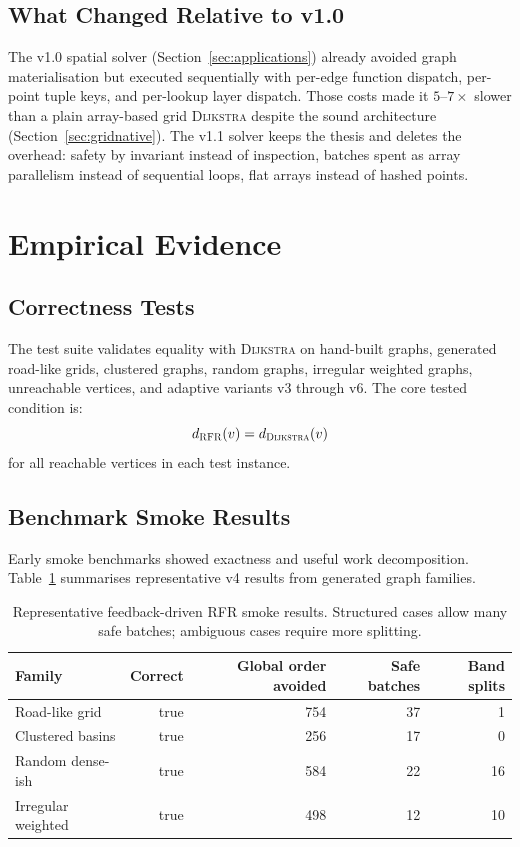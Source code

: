 \documentclass[11pt]{article}
\newcommand{\RFR}{\textsc{RFR}}
\newcommand{\Dijkstra}{\textsc{Dijkstra}}
\begin{document}
\subsection{What Changed Relative to v1.0}

The v1.0 spatial solver (Section~\ref{sec:applications}) already avoided graph materialisation but executed sequentially with per-edge function dispatch, per-point tuple keys, and per-lookup layer dispatch. Those costs made it $5$--$7\times$ slower than a plain array-based grid \Dijkstra{} despite the sound architecture (Section~\ref{sec:gridnative}). The v1.1 solver keeps the thesis and deletes the overhead: safety by invariant instead of inspection, batches spent as array parallelism instead of sequential loops, flat arrays instead of hashed points.

\section{Empirical Evidence}
\label{sec:empirical}

\subsection{Correctness Tests}

The test suite validates equality with \Dijkstra{} on hand-built graphs, generated road-like grids, clustered graphs, random graphs, irregular weighted graphs, unreachable vertices, and adaptive variants v3 through v6. The core tested condition is:
\[
  d_{\RFR}(v)=d_{\Dijkstra}(v)
\]
for all reachable vertices in each test instance.

\subsection{Benchmark Smoke Results}

Early smoke benchmarks showed exactness and useful work decomposition. Table~\ref{tab:smoke} summarises representative v4 results from generated graph families.

\begin{table}[htbp]
\centering
\begin{tabular}{lrrrr}
\toprule
Family & Correct & Global order avoided & Safe batches & Band splits \\
\midrule
Road-like grid & true & 754 & 37 & 1 \\
Clustered basins & true & 256 & 17 & 0 \\
Random dense-ish & true & 584 & 22 & 16 \\
Irregular weighted & true & 498 & 12 & 10 \\
\bottomrule
\end{tabular}
\caption{Representative feedback-driven \RFR{} smoke results. Structured cases allow many safe batches; ambiguous cases require more splitting.}
\label{tab:smoke}
\end{table}
\end{document}
